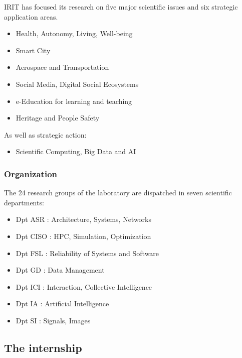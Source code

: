 \documentclass[
  a4paper, xcolor = usenames,dvipsnames]{article}
\providecommand{\tightlist}{%
  \setlength{\itemsep}{0pt}\setlength{\parskip}{0pt}}
\theoremstyle{definition}
\theoremstyle{definition}
\theoremstyle{definition}
\theoremstyle{definition}
\theoremstyle{remark}
\begin{document}
IRIT has focused its research on five major scientific issues and six strategic application areas.

\begin{itemize}
\tightlist
\item
  Health, Autonomy, Living, Well-being
\item
  Smart City
\item
  Aerospace and Transportation
\item
  Social Media, Digital Social Ecosystems
\item
  e-Education for learning and teaching
\item
  Heritage and People Safety
\end{itemize}

As well as strategic action:

\begin{itemize}
\tightlist
\item
  Scientific Computing, Big Data and AI
\end{itemize}

\hypertarget{organization}{%
\subsubsection{Organization}\label{organization}}

The 24 research groups of the laboratory are dispatched in seven scientific departments:

\begin{itemize}
\tightlist
\item
  Dpt ASR : Architecture, Systems, Networks
\item
  Dpt CISO : HPC, Simulation, Optimization
\item
  Dpt FSL : Reliability of Systems and Software
\item
  Dpt GD : Data Management
\item
  Dpt ICI : Interaction, Collective Intelligence
\item
  Dpt IA : Artificial Intelligence
\item
  Dpt SI : Signals, Images
\end{itemize}

\hypertarget{the-internship}{%
\subsection{The internship}\label{the-internship}}
\end{document}
